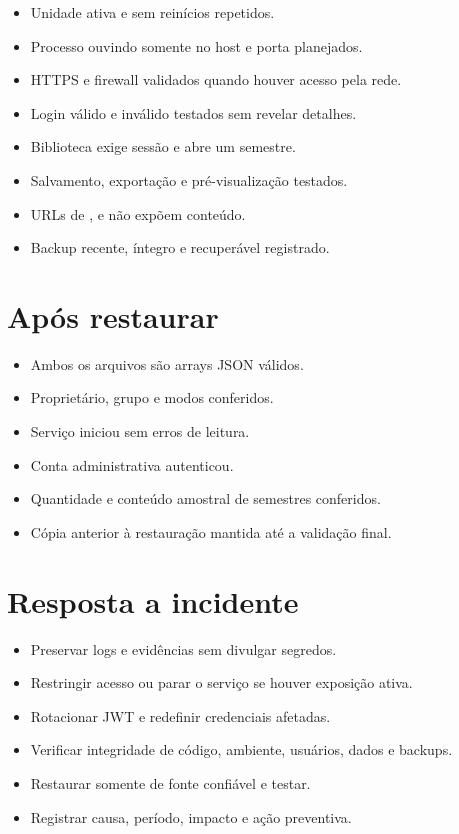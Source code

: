 \begin{itemize}
  \item[$\square$] Unidade ativa e sem reinícios repetidos.
  \item[$\square$] Processo ouvindo somente no host e porta planejados.
  \item[$\square$] HTTPS e firewall validados quando houver acesso pela rede.
  \item[$\square$] Login válido e inválido testados sem revelar detalhes.
  \item[$\square$] Biblioteca exige sessão e abre um semestre.
  \item[$\square$] Salvamento, exportação e pré-visualização testados.
  \item[$\square$] URLs de ,  e  não expõem conteúdo.
  \item[$\square$] Backup recente, íntegro e recuperável registrado.
\end{itemize}

\section{Após restaurar}

\begin{itemize}
  \item[$\square$] Ambos os arquivos são arrays JSON válidos.
  \item[$\square$] Proprietário, grupo e modos conferidos.
  \item[$\square$] Serviço iniciou sem erros de leitura.
  \item[$\square$] Conta administrativa autenticou.
  \item[$\square$] Quantidade e conteúdo amostral de semestres conferidos.
  \item[$\square$] Cópia anterior à restauração mantida até a validação final.
\end{itemize}

\section{Resposta a incidente}

\begin{itemize}
  \item[$\square$] Preservar logs e evidências sem divulgar segredos.
  \item[$\square$] Restringir acesso ou parar o serviço se houver exposição ativa.
  \item[$\square$] Rotacionar JWT e redefinir credenciais afetadas.
  \item[$\square$] Verificar integridade de código, ambiente, usuários, dados e backups.
  \item[$\square$] Restaurar somente de fonte confiável e testar.
  \item[$\square$] Registrar causa, período, impacto e ação preventiva.
\end{itemize}
